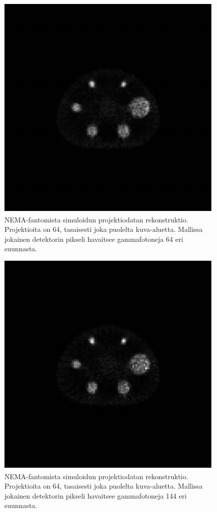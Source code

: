 \begin{figure}[H]
    \centering
    \captionsetup{width=.9\linewidth}
    \includegraphics[width=.9\linewidth]{kuvat/rekonstruktio_nRay64.pdf}
    \caption{NEMA-fantomista simuloidun projektiodatan rekonstruktio. Projektioita on 64, tasaisesti joka puolelta kuva-aluetta. Mallissa jokainen detektorin pikseli havaitsee gammafotoneja 64 eri suunnasta.}
    \label{fig:rekonstruktio64}
\end{figure}
\begin{figure}[H]
    \centering
    \captionsetup{width=.9\linewidth}
    \includegraphics[width=.9\linewidth]{kuvat/rekonstruktio_nRay144.pdf}
    \caption{NEMA-fantomista simuloidun projektiodatan rekonstruktio. Projektioita on 64, tasaisesti joka puolelta kuva-aluetta. Mallissa jokainen detektorin pikseli havaitsee gammafotoneja 144 eri suunnasta.}
    \label{fig:rekonstruktio144}
\end{figure}